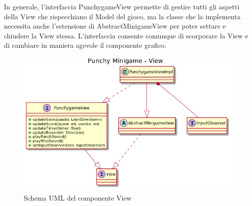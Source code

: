 \documentclass[a4paper,12pt]{report}
\begin{document}
	In generale, l'interfaccia PunchygameView permette di gestire tutti gli aspetti della View che rispecchiano il Model del gioco, ma la classe che la implementa necessita anche l'estensione di AbstractMinigameView per poter settare e chiudere la View stessa.
    L'interfaccia consente comunque di scorporare la View e di cambiare in maniera agevole il componente grafico.\newline
    \begin{figure}[!t]
        \centering{}
        \includegraphics[width=150mm]{images/picchiotti/punchyview.png}
        \caption{Schema UML del componente View}
        \label{img:punchyview}
    \end{figure}
\end{document}
